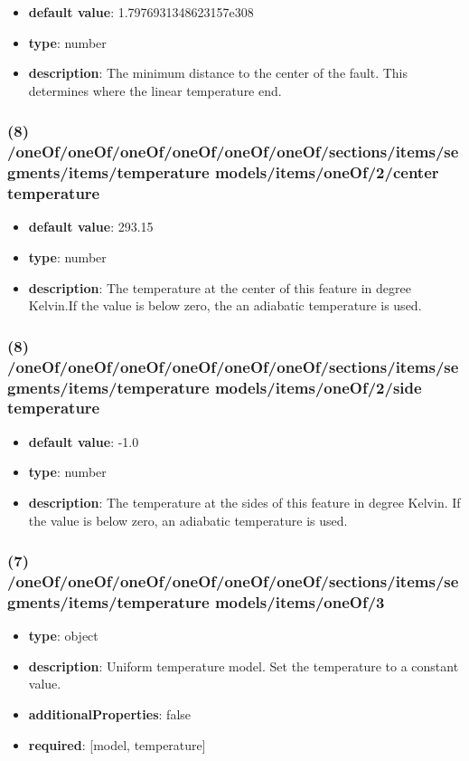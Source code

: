 \begin{itemize}[leftmargin=8em]\item {\bf default value}: 1.7976931348623157e308
\item {\bf type}: number
\item {\bf description}: The minimum distance to the center of the fault. This determines where the linear temperature end.
\end{itemize}\subsubsection{(8) /oneOf/oneOf/oneOf/oneOf/oneOf/oneOf/sections/items/segments/items/temperature models/items/oneOf/2/center temperature}
\begin{itemize}[leftmargin=8em]\item {\bf default value}: 293.15
\item {\bf type}: number
\item {\bf description}: The temperature at the center of this feature in degree Kelvin.If the value is below zero, the an adiabatic temperature is used.
\end{itemize}\subsubsection{(8) /oneOf/oneOf/oneOf/oneOf/oneOf/oneOf/sections/items/segments/items/temperature models/items/oneOf/2/side temperature}
\begin{itemize}[leftmargin=8em]\item {\bf default value}: -1.0
\item {\bf type}: number
\item {\bf description}: The temperature at the sides of this feature in degree Kelvin. If the value is below zero, an adiabatic temperature is used.
\end{itemize}\subsubsection{(7) /oneOf/oneOf/oneOf/oneOf/oneOf/oneOf/sections/items/segments/items/temperature models/items/oneOf/3}
\begin{itemize}[leftmargin=7em]\item {\bf type}: object
\item {\bf description}: Uniform temperature model. Set the temperature to a constant value.
\item {\bf additionalProperties}: false
\item {\bf required}: [model, temperature]\end{itemize}
